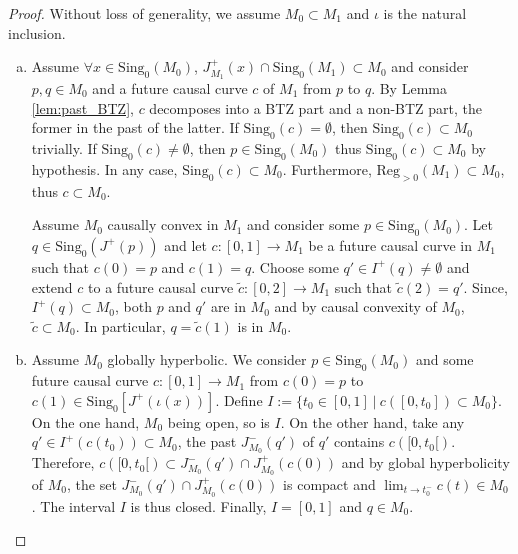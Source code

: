 \documentclass[a4paper,12pt]{article}
\def\sing{\mathrm{Sing}}
\def\Reg{\mathrm{Reg}}
\def\reg{\Reg}
\begin{document}
\begin{proof}
Without loss of generality, we assume $M_0\subset M_1$ and $\iota$ is the natural inclusion.
\begin{enumerate}[(a)]
\item Assume $\forall x\in \sing_0(M_0)$, $J^+_{M_1}(x) \cap \sing_0(M_1) \subset M_0$ and consider $p,q\in M_0$ and a future causal curve $c$ of $M_1$ from $p$ to  $q$. By Lemma \ref{lem:past_BTZ}, $c$ decomposes into a BTZ part and a non-BTZ part, the former in the past of the latter. 
If $\sing_0(c)=\emptyset$, then $\sing_0(c)\subset M_0$ trivially. If $\sing_0(c)\neq \emptyset$, then $p\in\sing_0(M_0)$ thus $\sing_0(c)\subset M_0$ by hypothesis. In any case,  $\sing_0(c)\subset M_0$.
Furthermore, $\reg_{>0}(M_1)\subset M_0$, thus $c\subset M_0$.

Assume $M_0$ causally convex in $M_1$ and consider some $p\in \sing_0(M_0)$.  Let $q\in \sing_0(J^+(p))$ and let $c:[0,1]\rightarrow M_1$ be a future causal curve in $M_1$  such that $c(0)=p$ and $c(1)=q$. 
Choose some $q'\in I^+(q)\neq \emptyset$ and extend $c$ to a future causal curve $\widetilde c:[0,2] \rightarrow M_1$ such that $\widetilde c(2)=q'$. Since, $I^+(q)\subset M_0$, both $p$ and $q'$ are in $M_0$ and by causal convexity of $M_0$, $\widetilde c \subset M_0$. In particular, $q=\widetilde c(1)$ is in $M_0$.

\item Assume $M_0$ globally hyperbolic. We consider $p\in \sing_0(M_0)$ and some future causal curve $c:[0,1]\rightarrow M_1$ from $c(0)=p$ to $c(1)\in \sing_0\left[J^+(\iota(x))\right]$. 
Define $I:= \{t_0\in[0,1]~|~ c([0,t_0]) \subset M_0\}$. On the one hand, $M_0$ being open, so is $I$. On the other hand, take any $q'\in I^+(c(t_0))\subset M_0$, the past $J^-_{M_0}(q')$ of $q'$ contains $c([0,t_0[)$. Therefore, $c([0,t_0[)\subset J^-_{M_0}(q')\cap J^+_{M_0}(c(0))$ and by global hyperbolicity of $M_0$, the set $J^-_{M_0}(q')\cap J^+_{M_0}(c(0))$ is compact and  $\lim_{t\rightarrow t_0^-} c(t)\in M_0$. 
The interval $I$ is thus closed. Finally, $I=[0,1]$ and $q\in M_0$.


\end{enumerate}
\end{proof}
\end{document}

